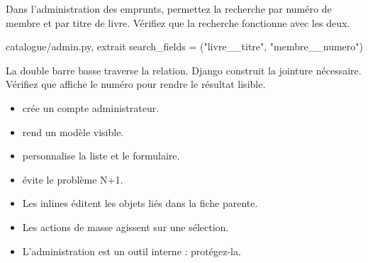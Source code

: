 \begin{exercice}
Dans l'administration des emprunts, permettez la recherche par numéro de membre et
par titre de livre. Vérifiez que la recherche fonctionne avec les deux.
\end{exercice}

\begin{correction}
\begin{codebox}[python]{catalogue/admin.py, extrait}
search_fields = ("livre__titre", "membre__numero")
\end{codebox}

La double barre basse traverse la relation. Django construit la jointure
nécessaire. Vérifiez que  affiche le numéro pour rendre le
résultat lisible.
\end{correction}

\begin{retenir}
\begin{itemize}
  \item {} crée un compte administrateur.
  \item {} rend un modèle visible.
  \item {} personnalise la liste et le formulaire.
  \item {} évite le problème N+1.
  \item Les inlines éditent les objets liés dans la fiche parente.
  \item Les actions de masse agissent sur une sélection.
  \item L'administration est un outil interne : protégez-la.
\end{itemize}
\end{retenir}
